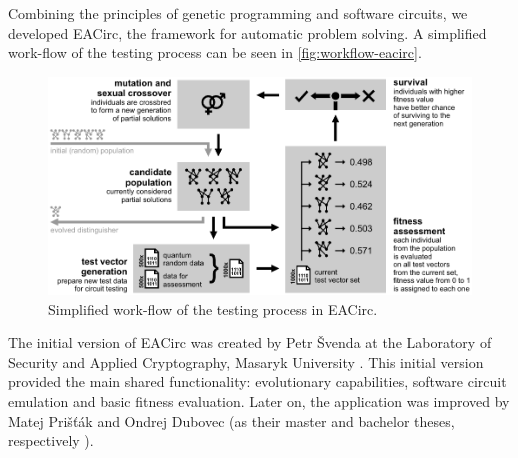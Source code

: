 \documentclass[12pt,oneside]{fithesis2}		%
\renewcommand{\_}{\leavevmode \kern0.0em\vbox{\hrule width0.4em}}
\begin{document}
Combining the principles of genetic programming and software circuits, we developed EACirc, the framework for automatic
problem solving. %
A simplified work-flow of the testing process can be seen in \autoref{fig:workflow-eacirc}.

\begin{figure}[b!]
\centering
\includegraphics[width=\textwidth]{images/workflow-eacirc}
\caption{Simplified work-flow of the testing process in EACirc.}
\label{fig:workflow-eacirc}
\end{figure}

The initial version of EACirc was created by Petr Švenda at 
the Laboratory of Security and Applied Cryptography, Masaryk University \parencite{labak}.
This initial version provided the main shared functionality: evolutionary capabilities, software circuit emulation
and basic fitness evaluation. Later on, the application was improved by Matej Prišťák and Ondrej Dubovec 
(as their master and bachelor theses, respectively \parencite{thesis-pristak, thesis-dubovec}).
\end{document}

